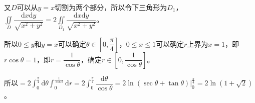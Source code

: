\documentclass[UTF8, 12pt]{ctexart}
\begin{document}
又$D$可以从$y=x$切割为两个部分，所以令下三角形为$D_1$，$\displaystyle{\iint\limits_D\dfrac{\textrm{d}x\textrm{d}y}{\sqrt{x^2+y^2}}}=2\displaystyle{\iint\limits_{D_1}\dfrac{\textrm{d}x\textrm{d}y}{\sqrt{x^2+y^2}}}$。

所以$0\leqslant y$和$y=x$可以确定$\theta\in\left[0,\dfrac{\pi}{4}\right]$，$0\leqslant x\leqslant1$可以确定$r$上界为$x=1$，即$r\cos\theta=1$，即$r=\dfrac{1}{\cos\theta}$，确定$r\in\left[0,\dfrac{1}{\cos\theta}\right]$。

所以$=2\int_0^{\frac{\pi}{4}}\textrm{d}\theta\int_0^{\frac{1}{\cos\theta}}\textrm{d}r=2\int_0^{\frac{\pi}{4}}\dfrac{\textrm{d}\theta}{\cos\theta}=2\ln(\sec\theta+\tan\theta)|_0^{\frac{\pi}{4}}=2\ln(1+\sqrt{2})$。
\end{document}
